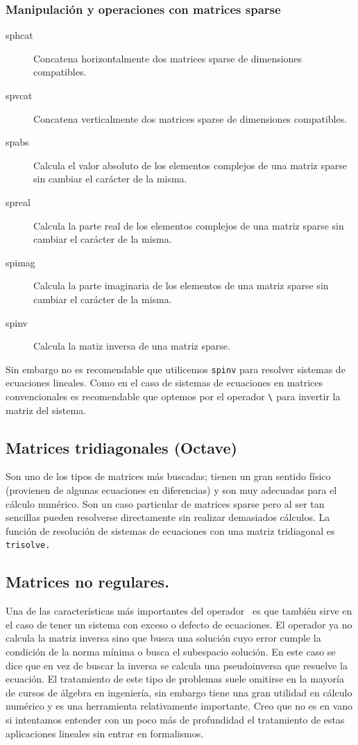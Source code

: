\subsubsection{Manipulación y operaciones con matrices sparse}

\begin{description}
\item [sphcat]Concatena horizontalmente dos matrices sparse
de dimensiones compatibles.
\item [spvcat]Concatena verticalmente dos matrices sparse
de dimensiones compatibles.
\item [spabs]Calcula el valor absoluto de los elementos complejos
de una matriz sparse sin cambiar el carácter de la misma.
\item [spreal]Calcula la parte real de los elementos complejos
de una matriz sparse sin cambiar el carácter de la misma.
\item [spimag]Calcula la parte imaginaria de los elementos
de una matriz sparse sin cambiar el carácter de la misma.
\item [spinv]Calcula la matiz inversa de una matriz sparse.
\end{description}
Sin embargo no es recomendable que utilicemos \texttt{spinv} para
resolver sistemas de ecuaciones lineales. Como en el caso de sistemas
de ecuaciones en matrices convencionales es recomendable que optemos
por el operador \texttt{\textbackslash{}} para invertir la matriz
del sistema.


\subsection{Matrices tridiagonales (Octave)}

Son uno de los tipos de matrices más buscadas; tienen un gran sentido
físico (provienen de algunas ecuaciones en diferencias) y son muy
adecuadas para el cálculo numérico. Son un caso particular de matrices
sparse pero al ser tan sencillas pueden resolverse directamente sin
realizar demasiados cálculos. La función de resolución de sistemas
de ecuaciones con una matriz tridiagonal es \texttt{trisolve.}


\subsection{Matrices no regulares.}

Una de las características más importantes del operador \
es que también sirve en el caso de tener un sistema con exceso o defecto
de ecuaciones. El operador ya no calcula la matriz inversa sino que
busca una solución cuyo error cumple la condición de la norma mínima
o busca el subespacio solución. En este caso se dice que en vez de
buscar la inversa se calcula una pseudoinversa que resuelve la ecuación.
El tratamiento de este tipo de problemas suele omitirse en la mayoría
de cursos de álgebra en ingeniería, sin embargo tiene una gran utilidad
en cálculo numérico y es una herramienta relativamente importante.
Creo que no es en vano si intentamos entender con un poco más de profundidad
el tratamiento de estas aplicaciones lineales sin entrar en formalismos.


